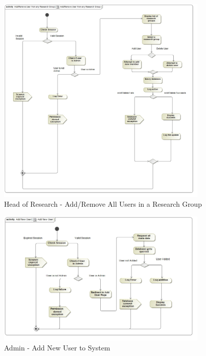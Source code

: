 \documentclass{article}
\begin{document}
			\begin{figure}[H]
				\includegraphics[width=4in, center]{../Diagrams/Process Specifications/User subsystem/Add_Remove User from any Research Group.jpg}
				\caption{Head of Research - Add/Remove All Users in a Research Group}
			\end{figure}
			\begin{figure}[H]
				\includegraphics[width=4in, center]{../Diagrams/Process Specifications/User subsystem/Add New User.jpg}
				\caption{Admin - Add New User to System}
			\end{figure}
\end{document}
